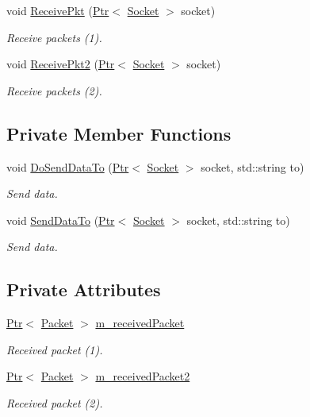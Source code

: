 \begin{DoxyCompactItemize}
void \hyperlink{classUdp6SocketImplTest_a9cd13c36dbcbebd6c3e62ccbd03ff6fc}{Receive\+Pkt} (\hyperlink{classns3_1_1Ptr}{Ptr}$<$ \hyperlink{classns3_1_1Socket}{Socket} $>$ socket)
\begin{DoxyCompactList}\small\item\em Receive packets (1). \end{DoxyCompactList}\item 
void \hyperlink{classUdp6SocketImplTest_a66285083e8cd6b7884b63ca89282419a}{Receive\+Pkt2} (\hyperlink{classns3_1_1Ptr}{Ptr}$<$ \hyperlink{classns3_1_1Socket}{Socket} $>$ socket)
\begin{DoxyCompactList}\small\item\em Receive packets (2). \end{DoxyCompactList}\end{DoxyCompactItemize}
\subsection*{Private Member Functions}
\begin{DoxyCompactItemize}
\item 
void \hyperlink{classUdp6SocketImplTest_aea2e3e7a4f51cdee3bd8c69b43ae169a}{Do\+Send\+Data\+To} (\hyperlink{classns3_1_1Ptr}{Ptr}$<$ \hyperlink{classns3_1_1Socket}{Socket} $>$ socket, std\+::string to)
\begin{DoxyCompactList}\small\item\em Send data. \end{DoxyCompactList}\item 
void \hyperlink{classUdp6SocketImplTest_a427d2e3289403cb472bd8414114d2894}{Send\+Data\+To} (\hyperlink{classns3_1_1Ptr}{Ptr}$<$ \hyperlink{classns3_1_1Socket}{Socket} $>$ socket, std\+::string to)
\begin{DoxyCompactList}\small\item\em Send data. \end{DoxyCompactList}\end{DoxyCompactItemize}
\subsection*{Private Attributes}
\begin{DoxyCompactItemize}
\item 
\hyperlink{classns3_1_1Ptr}{Ptr}$<$ \hyperlink{classns3_1_1Packet}{Packet} $>$ \hyperlink{classUdp6SocketImplTest_a0fe42d497152d2bbfa1660fbe5078c8a}{m\+\_\+received\+Packet}
\begin{DoxyCompactList}\small\item\em Received packet (1). \end{DoxyCompactList}\item 
\hyperlink{classns3_1_1Ptr}{Ptr}$<$ \hyperlink{classns3_1_1Packet}{Packet} $>$ \hyperlink{classUdp6SocketImplTest_a7bd5d6c237574c130414e505553bd13b}{m\+\_\+received\+Packet2}
\begin{DoxyCompactList}\small\item\em Received packet (2). \end{DoxyCompactList}\end{DoxyCompactItemize}
